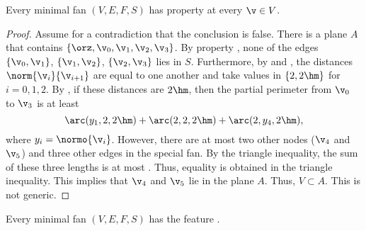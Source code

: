 \begin{lemma}[]
Every minimal fan $(V,E,F,S)$ has property
 at every $\v\in V$.
\end{lemma}

\begin{proof} %
Assume for a contradiction that the conclusion is false.  There is a
plane $A$ that contains $\{\orz,\v_0,\v_1,\v_2,\v_3\}$.  By property
, none of the edges $\{\v_0,\v_1\}$, $\{\v_1,\v_2\}$,
$\{\v_2,\v_3\}$ lies in $S$.  Furthermore, by 
and , the distances $\norm{\v_i}{\v_{i+1}}$ are equal
to one another and take values in $\{2,2\hm\}$ for $i=0,1,2$.  By
, if these distances are $2\hm$, then the partial
perimeter from $\v_0$ to $\v_3$ is at least
\begin{equation}\label{eqn:3side}
\arc(y_1,2,2\hm)+\arc(2,2,2\hm)+\arc(2,y_4,2\hm),
\end{equation}
where $y_i=\normo{\v_i}$.  However, there are at most two other nodes
($\v_4$ and $\v_5$) and three other edges in the special fan.  By the
triangle inequality, the sum of these three lengths is at most
.  Thus, equality is obtained in the triangle
inequality.  This implies that $\v_4$ and $\v_5$ lie in the plane $A$.
Thus, $V\subset A$.  This is not generic.
\end{proof}

\begin{lemma}[]
Every minimal fan $(V,E,F,S)$ has the feature .
\end{lemma}

